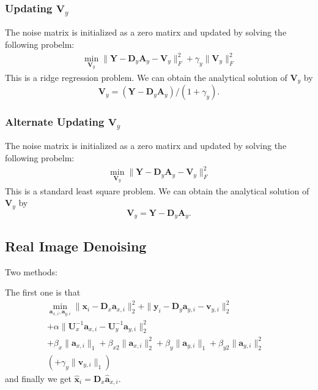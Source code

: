 \documentclass[10pt,twocolumn,letterpaper]{article}
\begin{document}
\subsubsection{Updating $\bm{V}_{y}$}
The noise matrix is initialized as a zero matirx and updated by solving the following probelm:
\begin{equation}
\begin{split}
\min_{\bm{V}_{y}}
\|\bm{Y}-\bm{D}_{y}\bm{A}_{y}-\bm{V}_{y}\|_{F}^{2}
+
\gamma_{y}\|\bm{V}_{y}\|_{F}^{2}
\end{split}
\end{equation}
This is a ridge regression problem. We can obtain the analytical solution of $\bm{V}_{y}$ by 
\begin{equation}
\bm{V}_{y} = (\bm{Y}-\bm{D}_{y}\bm{A}_{y})/(1+\gamma_{y}).
\end{equation}

\subsubsection{Alternate Updating $\bm{V}_{y}$}
The noise matrix is initialized as a zero matirx and updated by solving the following probelm:
\begin{equation}
\begin{split}
\min_{\bm{V}_{y}}
\|\bm{Y}-\bm{D}_{y}\bm{A}_{y}-\bm{V}_{y}\|_{F}^{2}
\end{split}
\end{equation}
This is a standard least square problem. We can obtain the analytical solution of $\bm{V}_{y}$ by 
\begin{equation}
\bm{V}_{y} = \bm{Y}-\bm{D}_{y}\bm{A}_{y}.
\end{equation}





\subsection{Real Image Denoising}
Two methods:

The first one is that
\begin{equation}
\begin{split}
\min_{\bm{a}_{x,i},\bm{a}_{y,i}}
\|\bm{x}_{i}-\bm{D}_{x}\bm{a}_{x,i}\|_{2}^{2}
+
\|\bm{y}_{i}-\bm{D}_{y}\bm{a}_{y,i}-\bm{v}_{y,i}\|_{2}^{2}
\\
+
\alpha
\|\bm{U}_{x}^{-1}\bm{a}_{x,i}-\bm{U}_{y}^{-1}\bm{a}_{y,i}\|_{2}^{2}&
\\
+
\beta_{x}\|\bm{a}_{x,i}\|_{1}
+
\beta_{x2}\|\bm{a}_{x,i}\|_{2}^{2}
+
\beta_{y}\|\bm{a}_{y,i}\|_{1}
+
\beta_{y2}\|\bm{a}_{y,i}\|_{2}^{2}
&
\\
(+
\gamma_{y}\|\bm{v}_{y,i}\|_{1})
\end{split}
\end{equation}
and finally we get $\widehat{\bm{x}}_{i}=\bm{D}_{x}\widehat{\bm{a}}_{x,i}$.
\end{document}
